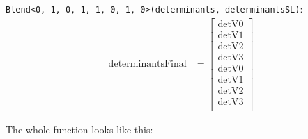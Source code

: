 \documentclass[fontsize = 10pt,DIV = 13]{scrartcl}
\begin{document}
\texttt{Blend<0, 1, 0, 1, 1, 0, 1, 0>(determinants, determinantsSL)}:
\begin{align*}
\mathrm{determinantsFinal} 
&=
\begin{bmatrix}
\mathrm{detV0}\\
\mathrm{detV1}\\
\mathrm{detV2}\\
\mathrm{detV3}\\
\mathrm{detV0}\\
\mathrm{detV1}\\
\mathrm{detV2}\\
\mathrm{detV3}\\
\end{bmatrix}
\end{align*}


The whole function looks like this:
\end{document}
